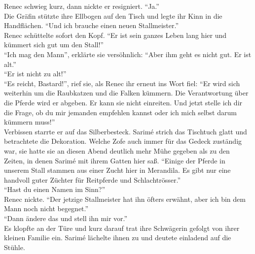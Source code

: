 Renec schwieg kurz, dann nickte er resigniert. ``Ja.''\\
Die Gräfin stützte ihre Ellbogen auf den Tisch und legte ihr Kinn in die Handflächen. ``Und ich 
brauche einen neuen Stallmeister.''\\
Renec schüttelte sofort den Kopf. ``Er ist sein ganzes Leben lang hier und kümmert sich gut um 
den Stall!''\\
``Ich mag den Mann'', erklärte sie versöhnlich: ``Aber ihm geht es nicht gut. Er ist alt.''\\
``Er ist nicht zu alt!''\\
``Es reicht, Bastard!'', rief sie, als Renec ihr erneut ins Wort fiel: ``Er wird sich weiterhin um 
die Raubkatzen und die Falken kümmern. Die Verantwortung über die Pferde wird er abgeben. Er kann 
sie nicht einreiten. Und jetzt stelle ich dir die Frage, ob du mir jemanden empfehlen 
kannst oder ich mich selbst darum kümmern muss!''\\
Verbissen starrte er auf das Silberbesteck. Sarimé strich das Tischtuch glatt und betrachtete die 
Dekoration. Welche Zofe auch immer für das Gedeck zuständig war, sie hatte sie an diesen Abend 
deutlich mehr Mühe gegeben als zu den Zeiten, in denen Sarimé mit ihrem Gatten hier saß. 
``Einige der Pferde in unserem Stall stammen aus einer Zucht hier in Merandila. Es gibt nur eine 
handvoll guter Züchter für Reitpferde und Schlachtrösser.''\\
``Hast du einen Namen im Sinn?''\\
Renec nickte. ``Der jetzige Stallmeister hat ihn öfters erwähnt, aber ich bin dem Mann noch nicht 
begegnet.''\\
``Dann ändere das und stell ihn mir vor.''\\
Es klopfte an der Türe und kurz darauf trat ihre Schwägerin gefolgt von ihrer kleinen Familie ein. 
Sarimé lächelte ihnen zu und deutete einladend auf die Stühle. \\


